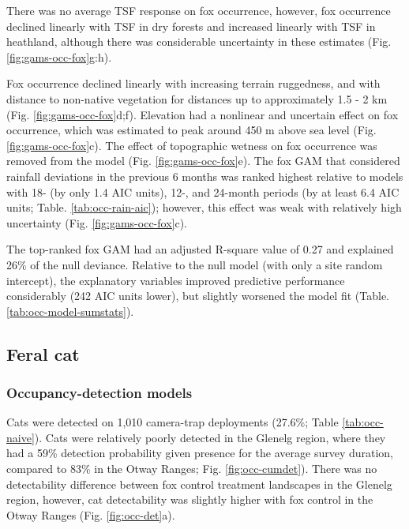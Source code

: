 \documentclass[11pt,a4paper,titlepage,twoside,openright]{style/unimelbthesis}
\begin{document}
\begin{mainmatter}
There was no average TSF response on fox occurrence, however, fox occurrence declined linearly with TSF in dry forests and increased linearly with TSF in heathland, although there was considerable uncertainty in these estimates (Fig. \ref{fig:gams-occ-fox}g:h).

Fox occurrence declined linearly with increasing terrain ruggedness, and with distance to non-native vegetation for distances up to approximately 1.5 - 2 km (Fig. \ref{fig:gams-occ-fox}d;f). Elevation had a nonlinear and uncertain effect on fox occurrence, which was estimated to peak around 450 m above sea level (Fig. \ref{fig:gams-occ-fox}c). The effect of topographic wetness on fox occurrence was removed from the model (Fig. \ref{fig:gams-occ-fox}e). The fox GAM that considered rainfall deviations in the previous 6 months was ranked highest relative to models with 18- (by only 1.4 AIC units), 12-, and 24-month periods (by at least 6.4 AIC units; Table. \ref{tab:occ-rain-aic}); however, this effect was weak with relatively high uncertainty (Fig. \ref{fig:gams-occ-fox}c).

The top-ranked fox GAM had an adjusted R-square value of 0.27 and explained 26\% of the null deviance. Relative to the null model (with only a site random intercept), the explanatory variables improved predictive performance considerably (242 AIC units lower), but slightly worsened the model fit (Table. \ref{tab:occ-model-sumstats}).

\hypertarget{feral-cat-1}{%
\subsection{Feral cat}\label{feral-cat-1}}

\hypertarget{occupancy-detection-models-2}{%
\subsubsection{Occupancy-detection models}\label{occupancy-detection-models-2}}

Cats were detected on 1,010 camera-trap deployments (27.6\%; Table \ref{tab:occ-naive}). Cats were relatively poorly detected in the Glenelg region, where they had a 59\% detection probability given presence for the average survey duration, compared to 83\% in the Otway Ranges; Fig. \ref{fig:occ-cumdet}). There was no detectability difference between fox control treatment landscapes in the Glenelg region, however, cat detectability was slightly higher with fox control in the Otway Ranges (Fig. \ref{fig:occ-det}a).


\end{mainmatter}
\end{document}
